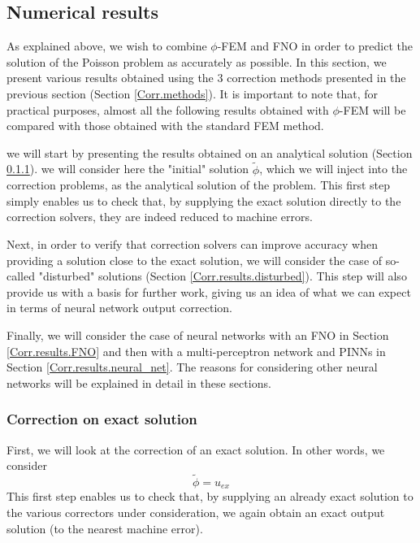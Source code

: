 \subsection{Numerical results} \label{Corr.results}

As explained above, we wish to combine $\phi$-FEM and FNO in order to predict the solution of the Poisson problem as accurately as possible. In this section, we present various results obtained using the 3 correction methods presented in the previous section (Section \ref{Corr.methods}). It is important to note that, for practical purposes, almost all the following results obtained with $\phi$-FEM will be compared with those obtained with the standard FEM method.

we will start by presenting the results obtained on an analytical solution (Section \ref{Corr.results.ana}). we will consider here the "initial" solution $\tilde{\phi}$, which we will inject into the correction problems, as the analytical solution of the problem. This first step simply enables us to check that, by supplying the exact solution directly to the correction solvers, they are indeed reduced to machine errors.

Next, in order to verify that correction solvers can improve accuracy when providing a solution close to the exact solution, we will consider the case of so-called "disturbed" solutions (Section \ref{Corr.results.disturbed}). This step will also provide us with a basis for further work, giving us an idea of what we can expect in terms of neural network output correction.

Finally, we will consider the case of neural networks with an FNO in Section \ref{Corr.results.FNO} and then with a multi-perceptron network and PINNs in Section \ref{Corr.results.neural_net}. The reasons for considering other neural networks will be explained in detail in these sections.

\subsubsection{Correction on exact solution} \label{Corr.results.ana}

First, we will look at the correction of an exact solution. In other words, we consider
\begin{equation*}
	\tilde{\phi}=u_{ex}
\end{equation*}
This first step enables us to check that, by supplying an already exact solution to the various correctors under consideration, we again obtain an exact output solution (to the nearest machine error).

